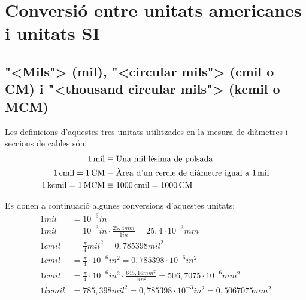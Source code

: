\section{Conversi\'{o} entre unitats americanes i unitats SI}

\subsection{{"<}Mils{">} (mil), {"<}circular mils{">} (cmil o CM) i {"<}thousand circular mils{">} (kcmil o MCM)}\label{sec:MCM}
  

  Les definicions d'aquestes tres unitats utilitzades en la mesura de di\`{a}metres i seccions de cables s\'{o}n:
\begin{align}
  1\unit{mil} &\equiv \text{Una mi{\l.l}\`{e}sima de polsada} \\
  1\unit{cmil} = 1\unit{CM} &\equiv  \text{\`{A}rea d'un cercle de di\`{a}metre igual a 1\unit{mil}} \\
  1\unit{kcmil} = 1\unit{MCM} &\equiv 1000\unit{cmil} = 1000\unit{CM}
\end{align}

  Es donen a continuaci\'{o} algunes conversions d'aquestes unitats:
\begin{align}
   1\unit{mil} &= 10^{-3}\unit{in}  \\
  1\unit{mil} &= 10^{-3}\unit{in} \cdot \frac{25{,}4\unit{mm}}{1\unit{in}} = 25{,}4 \cdot 10^{-3}\unit{mm}  \\
  1\unit{cmil} &= \frac{\pi}{4}\unit{mil^2} = 0{,}785398\unit{mil^2}   \\
   1\unit{cmil} &= \frac{\pi}{4}\cdot 10^{-6}\unit{in^2} = 0{,}785398\cdot 10^{-6}\unit{in^2} \\
   1\unit{cmil} &= \frac{\pi}{4} \cdot 10^{-6}\unit{in^2} \cdot \frac{645{,}16\unit{mm^2}}{1\unit{in^2}} = 506{,}7075\cdot 10^{-6}\unit{mm^2}
   \\[1ex]
   1\unit{kcmil} &= 785{,}398\unit{mil^2}  = 0{,}785398\cdot 10^{-3}\unit{in^2} = 0{,}5067075\unit{mm^2}
\end{align}

